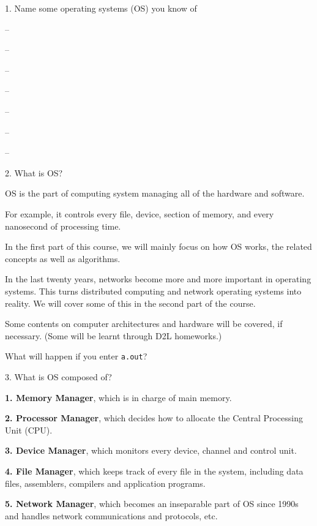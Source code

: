 \begin{slide}{ 1. Name some operating systems (OS) you know of}
\item --
\item --
\item --
\item --
\item --
\item --
\item --
\end{slide}

\begin{slide}{ 2. What is OS?}
\item OS is the part of computing system managing all of the hardware and software.
\item For example, it controls every file, device, section of memory, and every
nanosecond of processing time.
\item In the first part of this course, we will mainly focus on how OS works,
the related concepts as well as algorithms.
\item In the last twenty years, networks become more and more important in
operating systems. This turns distributed computing and network operating
systems into reality. We will cover some of this in the second part of the course.
\item Some contents on computer architectures and hardware will be covered, if necessary. (Some will be learnt through D2L homeworks.)
\vspace{3cm}
\item What will happen if you enter {\tt a.out}?
\end{slide}

\begin{slide}{ 3. What is OS composed of?}
\item {\bf 1. Memory Manager}, which is in charge of main memory.
\item {\bf 2. Processor Manager}, which decides how to allocate the Central Processing Unit (CPU).
\item {\bf 3. Device Manager}, which monitors every device, channel and control unit.
\item {\bf 4. File Manager}, which keeps track of every file in the system, including data files, assemblers, compilers and application programs.
\item {\bf 5. Network Manager}, which becomes an inseparable part of OS since 1990s and handles network communications and protocols, etc.
\end{slide}



